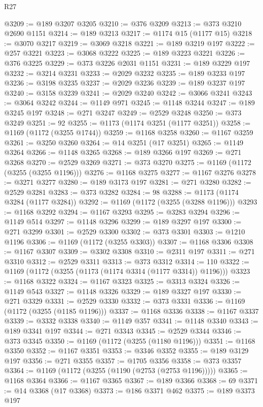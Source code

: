 \begin{lexlean}{R27}
\begin{coremodule}
@3209 := @189 @3207 @3205
@3210 := @376 @3209
@3213 := @373 @3210 @2690 @1151
@3214 := @189 @3213
@3217 := @1174 @15 (@1177 @15)
@3218 := @3070 @3217
@3219 := @3069 @3218
@3221 := @189 @3219 @197
@3222 := @257 @3221
@3223 := @3068 @3222
@3225 := @189 @3223 @3221
@3226 := @376 @3225
@3229 := @373 @3226 @2031 @1151
@3231 := @189 @3229 @197
@3232 := @3214 @3231
@3233 := @2029 @3232
@3235 := @189 @3233 @197
@3236 := @3198 @3235
@3237 := @2029 @3236
@3239 := @189 @3237 @197
@3240 := @3158 @3239
@3241 := @2029 @3240
@3242 := @3066 @3241
@3243 := @3064 @3242
@3244 := @1149 @971
@3245 := @1148 @3244
@3247 := @189 @3245 @197
@3248 := @271 @3247
@3249 := @2529 @3248
@3250 := @373 @3249
@3251 := 92
@3255 := @1173 (@1174 @3251 (@1177 @3251))
@3258 := @1169 (@1172 (@3255 @1744))
@3259 := @1168 @3258
@3260 := @1167 @3259
@3261 := @3250 @3260
@3264 := @14 @3251 (@17 @3251)
@3265 := @1149 @3264
@3266 := @1148 @3265
@3268 := @189 @3266 @197
@3269 := @271 @3268
@3270 := @2529 @3269
@3271 := @373 @3270
@3275 := @1169 (@1172 (@3255 (@3255 @1196)))
@3276 := @1168 @3275
@3277 := @1167 @3276
@3278 := @3271 @3277
@3280 := @189 @3173 @197
@3281 := @271 @3280
@3282 := @2529 @3281
@3283 := @373 @3282
@3284 := 98
@3288 := @1173 (@1174 @3284 (@1177 @3284))
@3292 := @1169 (@1172 (@3255 (@3288 @1196)))
@3293 := @1168 @3292
@3294 := @1167 @3293
@3295 := @3283 @3294
@3296 := @1149 @514
@3297 := @1148 @3296
@3299 := @189 @3297 @197
@3300 := @271 @3299
@3301 := @2529 @3300
@3302 := @373 @3301
@3303 := @1210 @1196
@3306 := @1169 (@1172 (@3255 @3303))
@3307 := @1168 @3306
@3308 := @1167 @3307
@3309 := @3302 @3308
@3310 := @2311 @197
@3311 := @271 @3310
@3312 := @2529 @3311
@3313 := @373 @3312
@3314 := 110
@3322 := @1169 (@1172 (@3255 (@1173 (@1174 @3314 (@1177 @3314)) @1196)))
@3323 := @1168 @3322
@3324 := @1167 @3323
@3325 := @3313 @3324
@3326 := @1149 @543
@3327 := @1148 @3326
@3329 := @189 @3327 @197
@3330 := @271 @3329
@3331 := @2529 @3330
@3332 := @373 @3331
@3336 := @1169 (@1172 (@3255 (@1185 @1196)))
@3337 := @1168 @3336
@3338 := @1167 @3337
@3339 := @3332 @3338
@3340 := @1149 @357
@3341 := @1148 @3340
@3343 := @189 @3341 @197
@3344 := @271 @3343
@3345 := @2529 @3344
@3346 := @373 @3345
@3350 := @1169 (@1172 (@3255 (@1180 @1196)))
@3351 := @1168 @3350
@3352 := @1167 @3351
@3353 := @3346 @3352
@3355 := @189 @3129 @197
@3356 := @271 @3355
@3357 := @1705 @3356
@3358 := @373 @3357
@3364 := @1169 (@1172 (@3255 (@1190 (@2753 (@2753 @1196)))))
@3365 := @1168 @3364
@3366 := @1167 @3365
@3367 := @189 @3366
@3368 := 69
@3371 := @14 @3368 (@17 @3368)
@3373 := @186 @3371 @462
@3375 := @189 @3373 @197

\end{coremodule}
\end{lexlean}
